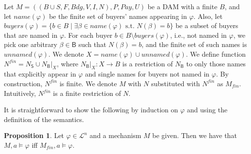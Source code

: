 \documentclass[letterpaper]{article} %
\theoremstyle{definition}
\newtheorem{proposition}{Proposition}
\newcommand{\Pay}{\mathit{Pay}}
\newcommand{\Nfin}{N^{\mathit{fin}}}
\newcommand{\Mfin}{M_{\mathit{fin}}}
\begin{document}
Let $M = ((B \cup S, F, Bdg, V, I, N), P, \Pay, U)$ be a DAM with a finite $B$, and let $name (\varphi) $ be the finite set of buyers' names appearing in $\varphi$. Also, let $\mathit{buyers} (\varphi) = \{b \in B \mid \exists \beta \in name(\varphi) \text{ s.t. } N(\beta) = b\}$ be a subset of buyers that are named in $\varphi$. For each buyer $b \in B \setminus \mathit{buyers} (\varphi)$, i.e., not named in $\varphi$, we pick one arbitrary $\beta \in \mathsf{B}$ such that $N(\beta) = b$, and the finite set of such names is $\mathit{unnamed} (\varphi)$. We denote $X = name (\varphi) \cup \mathit{unnamed} (\varphi)$. We define function $\Nfin = N_{\mathsf{S}} \cup N_{\mathsf{B}}|_{X}$, where $N_{\mathsf{B}}|_{X}:  X \to B$ is a restriction of $N_{\mathsf{B}}$ to only those names that explicitly appear in $\varphi$ and single names for buyers not named in $\varphi$. 
By construction, $\Nfin$ is finite.
We %
denote %
$M$ with $N$ substituted with $\Nfin$ as $\Mfin$.
Intuitively, $\Nfin$ is a finite restriction of $N$. 

It is straightforward to show the following by induction on $\varphi$ and using the definition of the semantics.
\begin{proposition}
Let $\varphi \in \mathcal{L}^n$ and a mechanism $M$ be given. Then we have that $M,a \models \varphi$ iff $\Mfin,a \models \varphi$.
\end{proposition}
\end{document}

